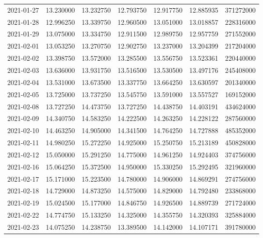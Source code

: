 \begin{tabular}{lrrrrrr}
2021-01-27 &   13.230000 &   13.232750 &   12.793750 &   12.917750 &   12.885935 &   371272000 \\
2021-01-28 &   12.996250 &   13.339750 &   12.960500 &   13.051000 &   13.018857 &   228316000 \\
2021-01-29 &   13.075000 &   13.334750 &   12.911500 &   12.989750 &   12.957759 &   271552000 \\
2021-02-01 &   13.053250 &   13.270750 &   12.902750 &   13.237000 &   13.204399 &   217204000 \\
2021-02-02 &   13.398750 &   13.572000 &   13.285500 &   13.556750 &   13.523361 &   220440000 \\
2021-02-03 &   13.636000 &   13.931750 &   13.516500 &   13.530500 &   13.497176 &   245408000 \\
2021-02-04 &   13.531000 &   13.673500 &   13.337750 &   13.664250 &   13.630597 &   201340000 \\
2021-02-05 &   13.725000 &   13.737250 &   13.545750 &   13.591000 &   13.557527 &   169152000 \\
2021-02-08 &   13.727250 &   14.473750 &   13.727250 &   14.438750 &   14.403191 &   434624000 \\
2021-02-09 &   14.340750 &   14.583250 &   14.222500 &   14.263250 &   14.228122 &   287560000 \\
2021-02-10 &   14.463250 &   14.905000 &   14.341500 &   14.764250 &   14.727888 &   485352000 \\
2021-02-11 &   14.980250 &   15.272250 &   14.925000 &   15.250750 &   15.213189 &   450828000 \\
2021-02-12 &   15.050000 &   15.291250 &   14.775000 &   14.961250 &   14.924403 &   374756000 \\
2021-02-16 &   15.064250 &   15.372500 &   14.950000 &   15.330250 &   15.292495 &   321960000 \\
2021-02-17 &   15.171000 &   15.223500 &   14.780000 &   14.906000 &   14.869291 &   274756000 \\
2021-02-18 &   14.729000 &   14.873250 &   14.575000 &   14.829000 &   14.792480 &   233868000 \\
2021-02-19 &   15.024500 &   15.177000 &   14.846750 &   14.926500 &   14.889739 &   271724000 \\
2021-02-22 &   14.774750 &   15.133250 &   14.325000 &   14.355750 &   14.320393 &   325884000 \\
2021-02-23 &   14.075250 &   14.238750 &   13.389500 &   14.142000 &   14.107171 &   391780000 \\

\end{tabular}
